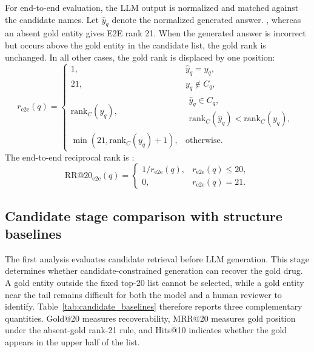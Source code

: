 \documentclass[pdflatex,sn-mathphys-num]{sn-jnl}
\newcommand{\tabref}[1]{Table~\ref{#1}}
\begin{document}
For end-to-end evaluation, the LLM output is normalized and matched against the candidate names. Let $\hat{y}_q$ denote the normalized generated answer. , whereas an absent gold entity gives E2E rank 21. When the generated answer is incorrect but occurs above the gold entity in the candidate list, the gold rank is unchanged. In all other cases, the gold rank is displaced by one position:
\begin{equation}
r_{\mathrm{e2e}}(q)=
\begin{cases}
1, & \hat{y}_q = y_q,\\
21, & y_q \notin C_q,\\
\mathrm{rank}_C(y_q), &
\begin{array}{l}
\hat{y}_q \in C_q,\\[-0.2em]
\mathrm{rank}_C(\hat{y}_q)<\mathrm{rank}_C(y_q),
\end{array}\\
\min(21,\mathrm{rank}_C(y_q)+1), & \mathrm{otherwise}.
\end{cases}
\label{eq:e2e_rank}
\end{equation}
The end-to-end reciprocal rank is :
\begin{equation}
\mathrm{RR@20}_{\mathrm{e2e}}(q)=
\begin{cases}
1/r_{\mathrm{e2e}}(q), & r_{\mathrm{e2e}}(q)\leq20,\\
0, & r_{\mathrm{e2e}}(q)=21.
\end{cases}
\label{eq:e2e_rr}
\end{equation}

\subsection{Candidate stage comparison with structure baselines}

The first analysis evaluates candidate retrieval before LLM generation. This stage determines whether candidate-constrained generation can recover the gold drug. A gold entity outside the fixed top-20 list cannot be selected, while a gold entity near the tail remains difficult for both the model and a human reviewer to identify. \tabref{tab:candidate_baselines} therefore reports three complementary quantities. Gold@20 measures recoverability, MRR@20 measures gold position under the absent-gold rank-21 rule, and Hits@10 indicates whether the gold appears in the upper half of the list.
\end{document}
